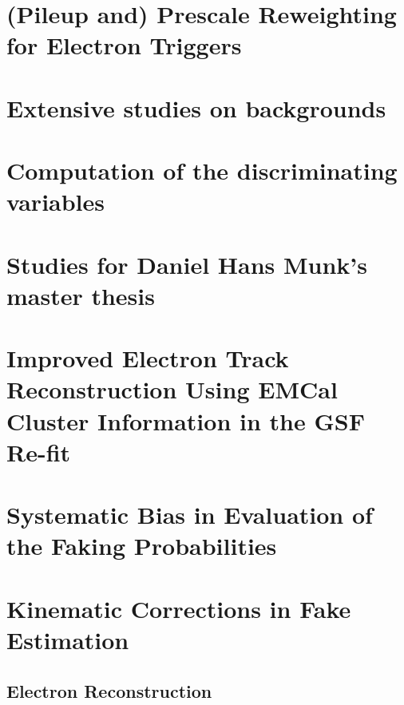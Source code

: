 \documentclass[NOTE, atlasdraft=true, texlive=2016, UKenglish]{atlasdoc}
\begin{document}
\clearpage
\section{(Pileup and) Prescale Reweighting for Electron Triggers}
\label{sec:prw-for-electron-triggers}


\clearpage 
\section{Extensive studies on backgrounds}
\label{sec:app:bkgdvij}


\clearpage

\section{Computation of the discriminating variables}
\label{sec:app:compdiscriminatingvars}


\clearpage

\section{Studies for Daniel Hans Munk's master thesis}
\label{sec:app:daniel}


\clearpage

\section{Improved Electron Track Reconstruction Using EMCal Cluster Information in the GSF Re-fit}
\label{sec:app:gsf-emcal}


\section{Systematic Bias in Evaluation of the Faking Probabilities}
\label{sec:app:fake-systematics}


\section{Kinematic Corrections in Fake Estimation}
\label{sec:app:kinematic-corrections}


\subsection{Electron Reconstruction}
\label{sec:app:prw-math}

\end{document}
